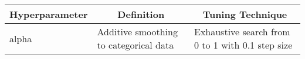 \begin{table}[H]
\centering
\begin{tabularx}{0.8\textwidth}{l|X|X}
\hline
\textbf{Hyperparameter} & \multicolumn{1}{c|}{\textbf{Definition}}    & \multicolumn{1}{c}{\textbf{Tuning Technique}}   \\ \hline
alpha                   & Additive smoothing to categorical data & Exhaustive search from 0 to 1 with 0.1 step size \\ \hline
\end{tabularx}
\end{table}
